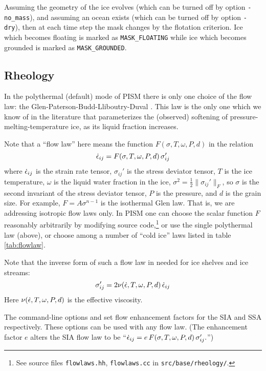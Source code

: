 Assuming the geometry of the ice evolves (which can be turned off by option \texttt{-no_mass}), and assuming an ocean exists (which can be turned off by option \texttt{-dry}), then at each time step the mask changes by the flotation criterion.  Ice which becomes floating is marked as \texttt{MASK_FLOATING} while ice which becomes grounded is marked as \texttt{MASK_GROUNDED}.

\subsection{Rheology}
\label{sec:rheology}

In the polythermal (default) mode of PISM there is only one choice of the flow law: the Glen-Paterson-Budd-Lliboutry-Duval \cite{AschwandenBlatter,LliboutryDuval1985,PatersonBudd}. This law is the only one which we know of in the literature that parameterizes the (observed) softening of pressure-melting-temperature ice, as its liquid fraction increases.

Note that a ``flow law'' here means the function $F(\sigma,T,\omega,P,d)$ in the relation
	$$\dot {\epsilon}_{ij} = F(\sigma,T,\omega,P,d)\, \sigma_{ij}'$$
where $\dot {\epsilon}_{ij}$ is the strain rate tensor, $\sigma_{ij}'$ is the stress deviator tensor, $T$ is the ice temperature, $\omega$ is the liquid water fraction in the ice, $\sigma^2 = \frac{1}{2} \|\sigma_{ij}'\|_F$, so $\sigma$ is the second invariant of the stress deviator tensor, $P$ is the pressure, and $d$ is the grain size. For example, $F = A \sigma^{n-1}$ is the isothermal Glen law. That is, we are addressing isotropic flow laws only.  In PISM one can choose the scalar function $F$ reasonably arbitrarily by modifying source code,\footnote{See source files \texttt{flowlaws.hh}, \texttt{flowlaws.cc} in \texttt{src/base/rheology/}.} or use the single polythermal law (above), or choose among a number of ``cold ice'' laws listed in table \ref{tab:flowlaw}.

Note that the inverse form of such a flow law in needed for ice shelves and ice streams:
	$$\sigma_{ij}' = 2 \nu(\dot{\epsilon},T,\omega,P,d)\,\dot {\epsilon}_{ij} $$
Here $\nu(\dot {\epsilon},T,\omega,P,d)$ is the effective viscosity.

The command-line options  and  set flow enhancement factors for the SIA and SSA respectively. These options can be used with any flow law.  (The enhancement factor $e$ alters the SIA flow law to be ``$\dot {\epsilon}_{ij} = e\, F(\sigma,T,\omega,P,d)\, \sigma_{ij}'.$'')

